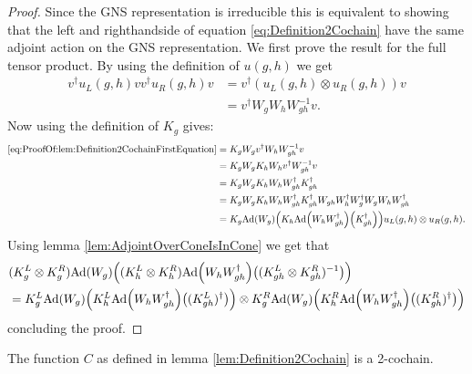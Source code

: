 \documentclass[12pt,a4paper,twoside]{article}
\numberwithin{equation}{section}
\begin{document}
\begin{proof}
	Since the GNS representation is irreducible this is equivalent to showing that the left and righthandside of equation \eqref{eq:Definition2Cochain} have the same adjoint action on the GNS representation. We first prove the result for the full tensor product. By using the definition of $u(g,h)$ we get
	\begin{align}\label{eq:ProofOf:lem:Definition2CochainFirstEquation}
		v^\dagger u_L(g,h)v v^\dagger u_R(g,h) v&=v^\dagger (u_L(g,h)\otimes u_R(g,h)) v\\
		&=v^\dagger W_g W_h W_{gh}^{-1}v.
	\end{align}
	Now using the definition of $K_g$ gives:
	\begin{align}
		\eqref{eq:ProofOf:lem:Definition2CochainFirstEquation}&=K_gW_g v^\dagger W_h W_{gh}^{-1}v\\
		&=K_gW_g K_h W_h v^\dagger W_{gh}^{-1}v\\
		&=K_gW_g K_h W_h W_{gh}^\dagger K_{gh}^\dagger\\
		&=K_gW_g K_h W_h W_{gh}^\dagger K_{gh}^\dagger W_{gh}W_h^\dagger W_g^\dagger W_gW_hW_{gh}^\dagger\\
		&=K_g\Ad{W_g}\left(K_h\Ad{W_hW_{gh}^\dagger}\left(K_{gh}^\dagger\right)\right)u_L(g,h)\otimes u_
			R(g,h).
	\end{align}
	Using lemma \ref{lem:AdjointOverConeIsInCone} we get that
	\begin{align}
		&(K_g^L\otimes K_g^R)\Ad{W_g}\left((K_h^L\otimes K_h^R)\Ad{W_hW_{gh}^\dagger}\left((K_{gh}^L\otimes K_{gh}^R)^{-1}\right)\right)\\
		&=K_g^L\Ad{W_g}\left(K_h^L\Ad{W_hW_{gh}^\dagger}\left((K_{gh}^L)^\dagger\right)\right)\otimes K_g^R\Ad{W_g}\left(K_h^R\Ad{W_hW_{gh}^\dagger}\left((K_{gh}^R)^\dagger\right)\right)
	\end{align}
	concluding the proof.
\end{proof}
\begin{lemma}
	The function $C$ as defined in lemma \ref{lem:Definition2Cochain} is a 2-cochain.
\end{lemma}
\end{document}
